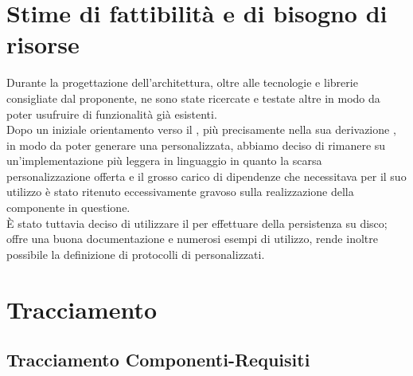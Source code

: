 \documentclass{scalatekids-article}
\begin{document}
\section{Stime di fattibilità e di bisogno di risorse}

Durante la progettazione dell'architettura, oltre alle tecnologie e librerie
consigliate dal proponente, ne sono state ricercate e testate altre in modo da
poter usufruire di funzionalità già esistenti.\\ Dopo un iniziale orientamento
verso il  , più precisamente nella sua
derivazione , in modo da poter generare una 
personalizzata, abbiamo deciso di rimanere su un'implementazione più leggera in
linguaggio  in quanto la scarsa personalizzazione offerta e il
grosso carico di dipendenze che necessitava  per il suo
utilizzo è stato ritenuto eccessivamente gravoso sulla realizzazione della
componente in questione.\\ È stato tuttavia deciso di utilizzare il
  per effettuare  della
persistenza su disco; offre una buona documentazione e numerosi esempi di
utilizzo, rende inoltre possibile la definizione di protocolli di
 personalizzati.

\section{Tracciamento}

\subsection{Tracciamento Componenti-Requisiti}
\end{document}
